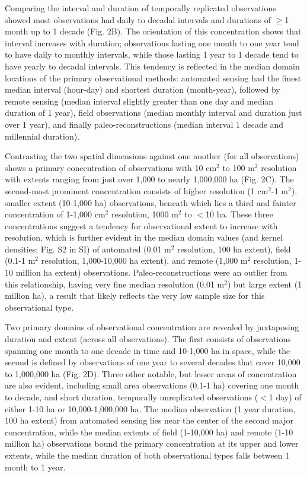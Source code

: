 \documentclass[12pt]{article}
\begin{document}
Comparing the interval and duration of temporally replicated observations showed most observations had daily to decadal intervals and durations of $\geq$1 month up to 1 decade (Fig. 2B). The orientation of this concentration shows that interval increases with duration; observations lasting one month to one year tend to have daily to monthly intervals, while those lasting 1 year to 1 decade tend to have yearly to decadal intervals. This tendency is reflected in the median domain locations of the primary observational methods: automated sensing had the finest median interval (hour-day) and shortest duration (month-year), followed by remote sensing (median interval slightly greater than one day and median duration of 1 year), field observations (median monthly interval and duration just over 1 year), and finally paleo-reconstructions (median interval 1 decade and millennial duration). 

Contrasting the two spatial dimensions against one another (for all observations) shows a primary concentration of observations with 10 cm$^2$ to 100 m$^2$ resolution with extents ranging from just over 1,000 to nearly 1,000,000 ha (Fig. 2C). The second-most prominent concentration consists of higher resolution (1 cm$^2$-1 m$^2$), smaller extent (10-1,000 ha) observations, beneath which lies a third and fainter concentration of 1-1,000 cm$^2$ resolution, 1000 m$^2$ to $<$10 ha. These three concentrations suggest a tendency for observational extent to increase with resolution, which is further evident in the median domain values (and kernel densities; Fig. S2 in SI) of automated (0.01 m$^2$ resolution, 100 ha extent), field (0.1-1 m$^2$ resolution, 1,000-10,000 ha extent), and remote (1,000 m$^2$ resolution, 1-10 million ha extent) observations.  Paleo-reconstructions were an outlier from this relationship, having very fine median resolution (0.01 m$^2$) but large extent (1 million ha), a result that likely reflects the very low sample size for this observational type. 

Two primary domains of observational concentration are revealed by juxtaposing duration and extent (across all observations). The first consists of observations spanning one month to one decade in time and 10-1,000 ha in space, while the second is defined by observations of one year to several decades that cover 10,000 to 1,000,000 ha (Fig. 2D).  Three other notable, but lesser areas of concentration are also evident, including small area observations (0.1-1 ha) covering one month to decade, and short duration, temporally unreplicated observations ($<$1 day) of either 1-10 ha or 10,000-1,000,000 ha.  The median observation (1 year duration, 100 ha extent) from automated sensing lies near the center of the second major concentration, while the median extents of field (1-10,000 ha) and remote (1-10 million ha) observations bound the primary concentration at its upper and lower extents, while the median duration of both observational types falls between 1 month to 1 year. 
\end{document}

